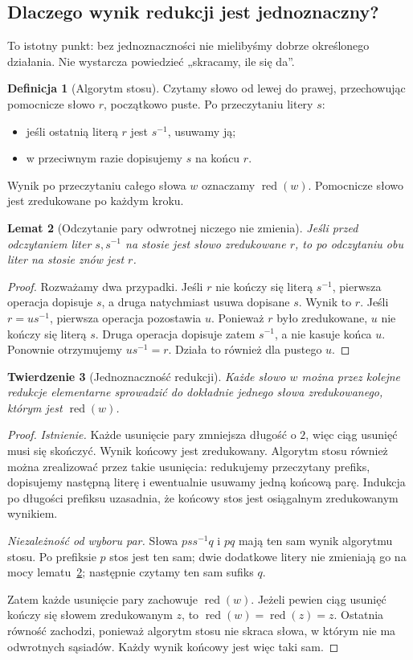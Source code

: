 \documentclass[11pt,a4paper]{article}
\numberwithin{equation}{section}
\theoremstyle{plain}
\newtheorem{twierdzenie}{Twierdzenie}[section]
\newtheorem{lemat}[twierdzenie]{Lemat}
\theoremstyle{definition}
\newtheorem{definicja}[twierdzenie]{Definicja}
\theoremstyle{remark}
\newcommand{\red}{\operatorname{red}}
\begin{document}
\subsection{Dlaczego wynik redukcji jest jednoznaczny?}
To istotny punkt: bez jednoznaczności nie mielibyśmy dobrze określonego działania. Nie wystarcza powiedzieć „skracamy, ile się da”.
\begin{definicja}[Algorytm stosu]
Czytamy słowo od lewej do prawej, przechowując pomocnicze słowo $r$, początkowo puste. Po przeczytaniu litery $s$:
\begin{itemize}
\item jeśli ostatnią literą $r$ jest $s^{-1}$, usuwamy ją;
\item w przeciwnym razie dopisujemy $s$ na końcu $r$.
\end{itemize}
Wynik po przeczytaniu całego słowa $w$ oznaczamy $\red(w)$. Pomocnicze słowo jest zredukowane po każdym kroku.
\end{definicja}
\begin{lemat}[Odczytanie pary odwrotnej niczego nie zmienia]\label{lem:stos}
Jeśli przed odczytaniem liter $s,s^{-1}$ na stosie jest słowo zredukowane $r$, to po odczytaniu obu liter na stosie znów jest $r$.
\end{lemat}
\begin{proof}
Rozważamy dwa przypadki. Jeśli $r$ nie kończy się literą $s^{-1}$, pierwsza operacja dopisuje $s$, a druga natychmiast usuwa dopisane $s$. Wynik to $r$. Jeśli $r=us^{-1}$, pierwsza operacja pozostawia $u$. Ponieważ $r$ było zredukowane, $u$ nie kończy się literą $s$. Druga operacja dopisuje zatem $s^{-1}$, a nie kasuje końca $u$. Ponownie otrzymujemy $us^{-1}=r$. Działa to również dla pustego $u$.
\end{proof}
\begin{twierdzenie}[Jednoznaczność redukcji]\label{tw:redukcja}
Każde słowo $w$ można przez kolejne redukcje elementarne sprowadzić do dokładnie jednego słowa zredukowanego, którym jest $\red(w)$.
\end{twierdzenie}
\begin{proof}
\emph{Istnienie.} Każde usunięcie pary zmniejsza długość o $2$, więc ciąg usunięć musi się skończyć. Wynik końcowy jest zredukowany. Algorytm stosu również można zrealizować przez takie usunięcia: redukujemy przeczytany prefiks, dopisujemy następną literę i ewentualnie usuwamy jedną końcową parę. Indukcja po długości prefiksu uzasadnia, że końcowy stos jest osiągalnym zredukowanym wynikiem.

\emph{Niezależność od wyboru par.} Słowa $pss^{-1}q$ i $pq$ mają ten sam wynik algorytmu stosu. Po prefiksie $p$ stos jest ten sam; dwie dodatkowe litery nie zmieniają go na mocy lematu~\ref{lem:stos}; następnie czytamy ten sam sufiks $q$.

Zatem każde usunięcie pary zachowuje $\red(w)$. Jeżeli pewien ciąg usunięć kończy się słowem zredukowanym $z$, to $\red(w)=\red(z)=z$. Ostatnia równość zachodzi, ponieważ algorytm stosu nie skraca słowa, w którym nie ma odwrotnych sąsiadów. Każdy wynik końcowy jest więc taki sam.
\end{proof}
\end{document}
